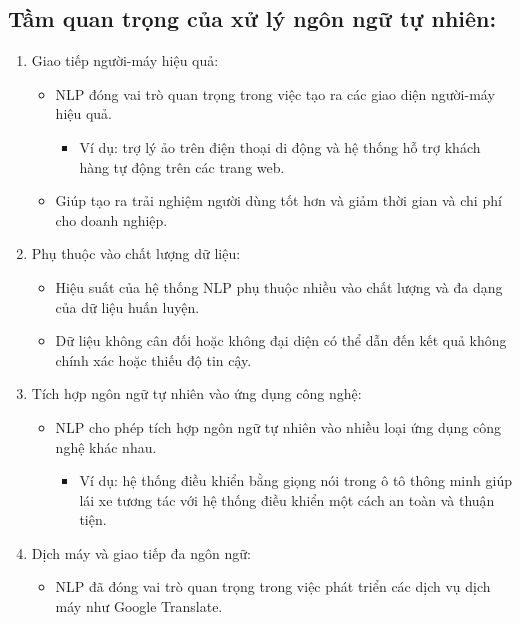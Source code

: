 \subsection{Tầm quan trọng của xử lý ngôn ngữ tự nhiên:}

 \begin{enumerate}
        \item Giao tiếp người-máy hiệu quả:
        \begin{itemize}
            \item NLP đóng vai trò quan trọng trong việc tạo ra các giao diện người-máy hiệu quả.
            \begin{itemize}
                \item Ví dụ: trợ lý ảo trên điện thoại di động và hệ thống hỗ trợ khách hàng tự động trên các trang web.
            \end{itemize}
            \item Giúp tạo ra trải nghiệm người dùng tốt hơn và giảm thời gian và chi phí cho doanh nghiệp.
        \end{itemize}
        \item Phụ thuộc vào chất lượng dữ liệu:
        \begin{itemize}
            \item Hiệu suất của hệ thống NLP phụ thuộc nhiều vào chất lượng và đa dạng của dữ liệu huấn luyện.
            \item Dữ liệu không cân đối hoặc không đại diện có thể dẫn đến kết quả không chính xác hoặc thiếu độ tin cậy.
        \end{itemize}
        \item Tích hợp ngôn ngữ tự nhiên vào ứng dụng công nghệ:
        \begin{itemize}
            \item NLP cho phép tích hợp ngôn ngữ tự nhiên vào nhiều loại ứng dụng công nghệ khác nhau.
            \begin{itemize}
                \item Ví dụ: hệ thống điều khiển bằng giọng nói trong ô tô thông minh giúp lái xe tương tác với hệ thống điều khiển một cách an toàn và thuận tiện.
            \end{itemize}
        \end{itemize}
        \item Dịch máy và giao tiếp đa ngôn ngữ:
        \begin{itemize}
            \item NLP đã đóng vai trò quan trọng trong việc phát triển các dịch vụ dịch máy như Google Translate.

\end{itemize}
\end{enumerate}
